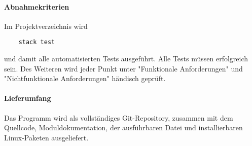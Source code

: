 \paragraph{Abnahmekriterien}
Im Projektverzeichnis wird
\begin{verbatim}
    stack test
\end{verbatim}
und damit alle automatisierten Tests ausgeführt. Alle Tests müssen erfolgreich
sein. Des Weiteren wird jeder Punkt unter "Funktionale Anforderungen" und
"Nichtfunktionale Anforderungen" händisch geprüft.

\paragraph{Lieferumfang}
Das Programm wird als vollständiges Git-Repository, zusammen mit dem Quellcode,
Moduldokumentation, der ausführbaren Datei und installierbaren Linux-Paketen
ausgeliefert.